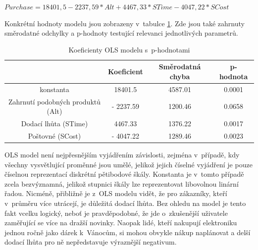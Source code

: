 \documentclass[12pt,twoside,openany]{fithesis}
\begin{document}
\begin{center}
$ Purchase = 18401,5 - 2237,59*Alt + 4467,33*STime - 4047,22*SCost $
\end{center}

Konkrétní hodnoty modelu jsou zobrazeny v~tabulce 
\hyperlink{tab-ols}{\ref{tab-ols}}.
Zde jsou také zahrnuty směrodatné odchylky a p-hodnoty testující relevanci jednotlivých parametrů.

            \begin{table}[htb]
                \begin{center}%
                    \begin{tabular}{|c|c|c|c|}
                        \hline 
                        {{}} & {{Koeficient}} & {{Směrodatná chyba}} & {{p-hodnota}} \tabularnewline
                         \hline 
                         {{konstanta}} & {{18401.5}} & {{4587.01}} & {{0.0001}} \tabularnewline
                          \hline 
                          {{Zahrnutí podobných produktů (Alt)}} & {{- 2237.59}} & {{1200.46}} & {{0.0658}} \tabularnewline
                           \hline 
                           {{Dodací lhůta (STime)}} & {{4467.33}} & {{1376.22}} & {{0.0017}} \tabularnewline
                            \hline 
                            {{Poštovné (SCost)}} & {{- 4047.22}} & {{1289.46}} & {{0.0023}} \tabularnewline
                            \hline 
                        \end{tabular}
                        \caption{Koeficienty OLS modelu s~p-hodnotami}\label{tab-ols}
                    \end{center}
                \end{table}

                OLS model není nejpřesnějším vyjádřením závislosti, 
zejména v~případě, kdy všechny vysvětlující proměnné jsou umělé, 
jelikož jejich číselné vyjádření je pouze číselnou reprezentací 
diskrétní pětibodové škály. Konstanta je v~tomto případě zcela 
bezvýznamná, jelikož stupnici škály lze reprezentovat libovolnou linární 
řadou. Nicméně, přibližně je z~OLS modelu vidět, že pro zákazníky, 
kteří v~průměru více utrácejí, je důležitá dodací lhůta. Bez ohledu 
na model je tento fakt vcelku logický, neboť je pravděpodobné, že jde 
o~zkušenější uživatele zaměřující se více na dražší novinky. 
Naopak lidé, kteří nakupují elektroniku jednou ročně jako dárek 
k~Vánocům, si mohou obvykle nákup naplánovat a delší dodací lhůta pro 
ně nepředstavuje výraznější negativum.
\end{document}
